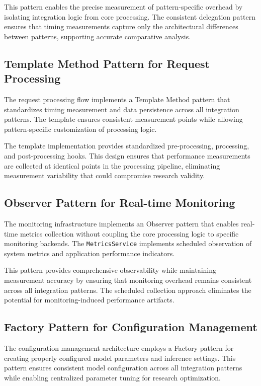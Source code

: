 This pattern enables the precise measurement of pattern-specific overhead by isolating integration logic from core processing. The consistent delegation pattern ensures that timing measurements capture only the architectural differences between patterns, supporting accurate comparative analysis.

\subsection{Template Method Pattern for Request Processing}

The request processing flow implements a Template Method pattern that standardizes timing measurement and data persistence across all integration patterns. The template ensures consistent measurement points while allowing pattern-specific customization of processing logic.

The template implementation provides standardized pre-processing, processing, and post-processing hooks. This design ensures that performance measurements are collected at identical points in the processing pipeline, eliminating measurement variability that could compromise research validity.

\subsection{Observer Pattern for Real-time Monitoring}

The monitoring infrastructure implements an Observer pattern that enables real-time metrics collection without coupling the core processing logic to specific monitoring backends. The \texttt{MetricsService} implements scheduled observation of system metrics and application performance indicators.

This pattern provides comprehensive observability while maintaining measurement accuracy by ensuring that monitoring overhead remains consistent across all integration patterns. The scheduled collection approach eliminates the potential for monitoring-induced performance artifacts.

\subsection{Factory Pattern for Configuration Management}

The configuration management architecture employs a Factory pattern for creating properly configured model parameters and inference settings. This pattern ensures consistent model configuration across all integration patterns while enabling centralized parameter tuning for research optimization.

